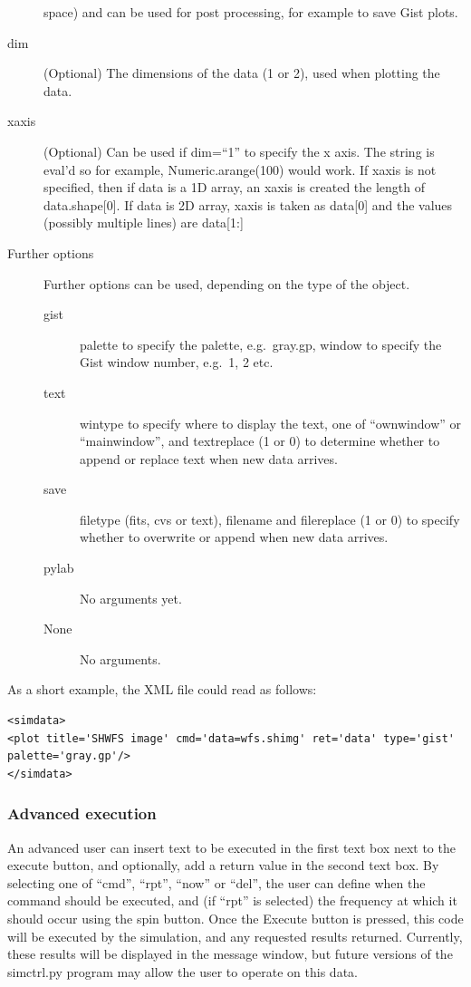 \documentclass{article}
\begin{document}
\begin{description}
  space) and can be used for post processing, for example to save Gist
  plots.  
\item[dim] (Optional) The dimensions of the data (1 or 2), used when
  plotting the data.
\item[xaxis] (Optional) Can be used if dim=``1'' to specify the x
  axis.  The string is eval'd so for example, Numeric.arange(100)
  would work.  If xaxis is not specified, then if data is a 1D array,
  an xaxis is created the length of data.shape[0].  If data is 2D
  array, xaxis is taken as data[0] and the values (possibly multiple
  lines) are data[1:]
\item[Further options] Further options can be used, depending on the
  type of the object.
  \begin{description}
    \item[gist] palette to specify the palette, e.g.\ gray.gp, window
    to specify the Gist window number, e.g.\ 1, 2 etc.
    \item[text] wintype to specify where to display the text, one of
    ``ownwindow'' or ``mainwindow'', and textreplace (1 or 0) to
    determine whether to append or replace text when new data arrives.
    \item[save] filetype (fits, cvs or text), filename and filereplace
    (1 or 0) to specify whether to overwrite or append when new data
    arrives.
    \item[pylab] No arguments yet.
    \item[None] No arguments.
  \end{description}
\end{description}

As a short example, the XML file could read as follows:
\begin{verbatim}
<simdata>
<plot title='SHWFS image' cmd='data=wfs.shimg' ret='data' type='gist' palette='gray.gp'/>
</simdata>
\end{verbatim}

\subsubsection{Advanced execution}
An advanced user can insert text to be executed in the first text box
next to the execute button, and optionally, add a return value in the
second text box.  By selecting one of ``cmd'', ``rpt'', ``now'' or
``del'', the user can define when the command should be executed, and
(if ``rpt'' is selected) the frequency at which it should occur using
the spin button.  Once the Execute button is pressed, this code will
be executed by the simulation, and any requested results returned.
Currently, these results will be displayed in the message window, but
future versions of the simctrl.py program may allow the user to
operate on this data.
\end{document}
